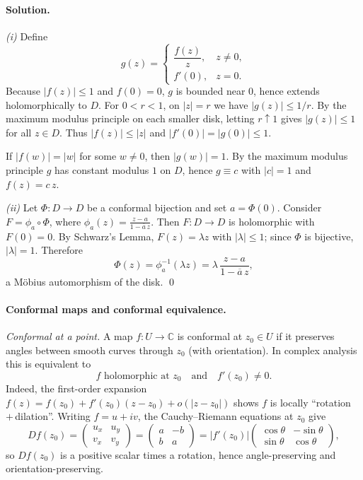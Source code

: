 \documentclass[11pt,a4paper]{article}
\theoremstyle{definition}
\theoremstyle{definition}
\theoremstyle{plain}
\theoremstyle{remark}
\begin{document}
\paragraph{Solution.}

\emph{(i)} Define
\[
g(z)=\begin{cases}
	\dfrac{f(z)}{z},& z\neq 0,\\[4pt]
	f'(0),& z=0.
\end{cases}
\]
Because $|f(z)|\le 1$ and $f(0)=0$, $g$ is bounded near $0$, hence extends holomorphically to $D$.
For $0<r<1$, on $|z|=r$ we have $|g(z)|\le 1/r$. By the maximum modulus principle on each smaller disk, letting $r\uparrow 1$ gives $|g(z)|\le 1$ for all $z\in D$.
Thus $|f(z)|\le |z|$ and $|f'(0)|=|g(0)|\le 1$.

If $|f(w)|=|w|$ for some $w\ne 0$, then $|g(w)|=1$. By the maximum modulus principle $g$ has constant modulus $1$ on $D$, hence $g\equiv c$ with $|c|=1$ and $f(z)=c\,z$.

\medskip
\emph{(ii)} Let $\Phi:D\to D$ be a conformal bijection and set $a=\Phi(0)$. Consider $F=\phi_a\circ \Phi$, where $\displaystyle \phi_a(z)=\frac{z-a}{1-\overline a\,z}$.
Then $F:D\to D$ is holomorphic with $F(0)=0$. By Schwarz's Lemma, $F(z)=\lambda z$ with $|\lambda|\le 1$; since $\Phi$ is bijective, $| \lambda|=1$.
Therefore
\[
\Phi(z)=\phi_a^{-1}(\lambda z)=\lambda\,\frac{z-a}{1-\overline a\,z},
\]
a Möbius automorphism of the disk.
\qed

\paragraph{Conformal maps and conformal equivalence.}

\emph{Conformal at a point.}
A map $f:U\to\mathbb C$ is conformal at $z_0\in U$ if it preserves angles between smooth curves through $z_0$ (with orientation). In complex analysis this is equivalent to
\[
f \text{ holomorphic at } z_0 \quad\text{and}\quad f'(z_0)\neq 0.
\]
Indeed, the first-order expansion $f(z)=f(z_0)+f'(z_0)(z-z_0)+o(|z-z_0|)$ shows $f$ is locally “rotation $+\,$dilation”. Writing $f=u+iv$, the Cauchy--Riemann equations at $z_0$ give
\[
Df(z_0)=
\begin{pmatrix}u_x & u_y\\ v_x & v_y\end{pmatrix}
=
\begin{pmatrix}a & -b\\ b & a\end{pmatrix}
=|f'(z_0)|
\begin{pmatrix}\cos\theta & -\sin\theta\\ \sin\theta & \cos\theta\end{pmatrix},
\]
so $Df(z_0)$ is a positive scalar times a rotation, hence angle-preserving and orientation-preserving.
\end{document}
